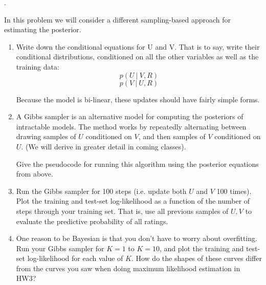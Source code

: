 \documentclass{harvardml}
\theoremstyle{plain}
\begin{document}
\begin{problem}.

  In this problem we will consider a different sampling-based approach for
  estimating the posterior.


\begin{enumerate}

\item Write down the conditional equations for U and V.  That is to say, write their conditional distributions, conditioned on all the other variables as well as the training data:
%
$$p(U\ |\ V, R )$$
$$p(V\ |\ U, R )$$

Because the model is bi-linear, these updates should have fairly simple forms.

\item A Gibbs sampler is an alternative model for computing the posteriors of intractable models.
The method works by repeatedly alternating between drawing samples of $U$ conditioned on $V$, and
then samples of $V$ conditioned on $U$. (We will derive in greater detail in coming classes).

Give the pseudocode for running this algorithm using the posterior equations from above.

\item Run the Gibbs sampler for 100 steps (i.e. update both $U$ and $V$ 100 times).
Plot the training and test-set log-likelihood as a function of the number of steps through your training set.
That is, use all previous samples of $U, V$ to evaluate the predictive probability of all ratings.

\item One reason to be Bayesian is that you don't have to worry about overfitting.
Run your Gibbs sampler for $K = 1$ to $K = 10$, and plot the training and test-set log-likelihood for each value of $K$.  
How do the shapes of these curves differ from the curves you saw when doing maximum likelihood estimation in HW3?


\end{enumerate}
\end{problem}
\end{document}
